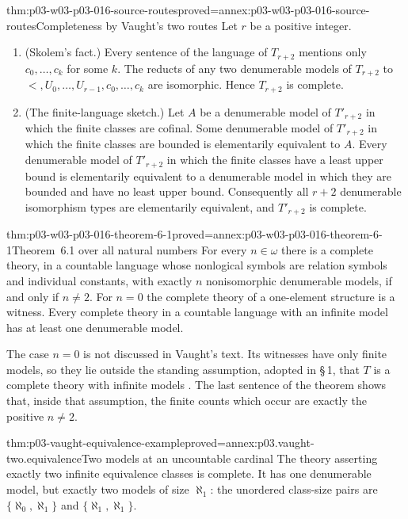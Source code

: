 \begin{hbtheorem}{thm:p03-w03-p03-016-source-routes}{proved=annex:p03-w03-p03-016-source-routes}{Completeness by Vaught's two routes}
Let \(r\) be a positive integer.
\begin{enumerate}
  \item (Skolem's fact.) Every sentence of the language of \(T_{r+2}\)
        mentions only \(c_0,\ldots,c_k\) for some \(k\). The reducts of any
        two denumerable models of \(T_{r+2}\) to
        \(<,U_0,\ldots,U_{r-1},c_0,\ldots,c_k\) are isomorphic. Hence
        \(T_{r+2}\) is complete.
  \item (The finite-language sketch.) Let \(A\) be a denumerable model of
        \(T'_{r+2}\) in which the finite classes are cofinal. Some
        denumerable model of \(T'_{r+2}\) in which the finite classes are
        bounded is elementarily equivalent to \(A\). Every denumerable model
        of \(T'_{r+2}\) in which the finite classes have a least upper bound
        is elementarily equivalent to a denumerable model in which they are
        bounded and have no least upper bound. Consequently all \(r+2\)
        denumerable isomorphism types are elementarily equivalent, and
        \(T'_{r+2}\) is complete.
\end{enumerate}
\end{hbtheorem}

\begin{hbtheorem}{thm:p03-w03-p03-016-theorem-6-1}{proved=annex:p03-w03-p03-016-theorem-6-1}{Theorem~6.1 over all natural numbers}
For every \(n\in\omega\) there is a complete theory, in a countable language
whose nonlogical symbols are relation symbols and individual constants, with
exactly \(n\) nonisomorphic denumerable models, if and only if \(n\ne2\).
For \(n=0\) the complete theory of a one-element structure is a witness.
Every complete theory in a countable language with an infinite model has at
least one denumerable model.
\end{hbtheorem}

The case \(n=0\) is not discussed in Vaught's text. Its witnesses have only
finite models, so they lie outside the standing assumption, adopted in
\S\,1, that \(T\) is a complete theory with infinite models
\cite[p.~306]{Vaught1961}. The last sentence of the theorem shows that,
inside that assumption, the finite counts which occur are exactly the
positive \(n\ne2\).

\begin{hbtheorem}{thm:p03-vaught-equivalence-example}{proved=annex:p03.vaught-two.equivalence}{Two models at an uncountable cardinal}
The theory asserting exactly two infinite equivalence classes is complete.
It has one denumerable model, but exactly two models of size \(\aleph_1\):
the unordered class-size pairs are
\(\{\aleph_0,\aleph_1\}\) and \(\{\aleph_1,\aleph_1\}\).
\end{hbtheorem}

